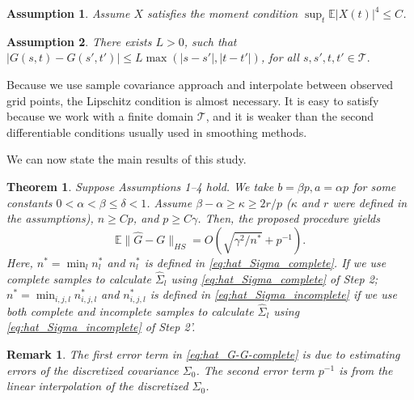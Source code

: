 \documentclass[11pt]{article}
\newtheorem{Theorem}{Theorem}
\newtheorem{Remark}{Remark}
\newtheorem{Assumption}{Assumption}
\newcommand{\0}{{\mathbf{0}}}
\newcommand{\1}{{\mathbf{1}}}
\begin{document}
\begin{Assumption} \label{as:sub-gaussian}
	Assume $X$ satisfies the moment condition $\sup_t\mathbb{E}|X(t)|^4 \leq C$.
\end{Assumption}

\begin{Assumption}\label{as:lipschitz}
	There exists $L>0$, such that $|G(s,t)-G(s',t')|\le L\max(|s-s'|,|t-t'|)$, for all $s,s',t,t'\in \mathcal{T}.$
\end{Assumption}
Because we use sample covariance approach and interpolate between observed grid points, the Lipschitz condition is almost necessary. It is easy to satisfy because we work with a finite domain $\mathcal{T}$, and it is weaker than the second differentiable conditions usually used in smoothing methods. 

We can now state the main results of this study. 

\begin{Theorem}\label{th:upper_bound_func}
	Suppose Assumptions 1--4 hold. We take $b = \beta p, a = \alpha p$ for some constants $0<\alpha < \beta \leq \delta < 1$. Assume $\beta-\alpha \geq \kappa\geq 2r/p$ ($\kappa$ and $r$ were defined in the assumptions), $n \geq C p$, and $p \geq C\gamma$. Then, the proposed procedure yields
	\begin{equation}\label{eq:hat_G-G-complete}
	\mathbb{E}\|\hat{G} - G\|_{HS} =  O\left(\sqrt{\gamma^2/n^\ast}  + p^{-1}\right).
	\end{equation}
	Here,  $n^\ast = \min_{l}n_l^\ast$ and $n_l^\ast$ is defined in \eqref{eq:hat_Sigma_complete}. If we use complete samples to calculate $\hat{\Sigma}_l$ using \eqref{eq:hat_Sigma_complete} of Step 2; $n^\ast = \min_{i, j, l}n^{\ast}_{i, j, l}$ and $n^\ast_{i, j, l}$ is defined in \eqref{eq:hat_Sigma_incomplete} if we use both complete and incomplete samples to calculate $\hat{\Sigma}_l$ using \eqref{eq:hat_Sigma_incomplete} of Step 2'.
	
\end{Theorem}


\begin{Remark}\rm
	The first error term in \eqref{eq:hat_G-G-complete} is due to estimating errors of the discretized covariance $\Sigma_0$. The second error term $p^{-1}$ is from the linear interpolation of the discretized $\Sigma_0$. 
\end{Remark}
\end{document}
